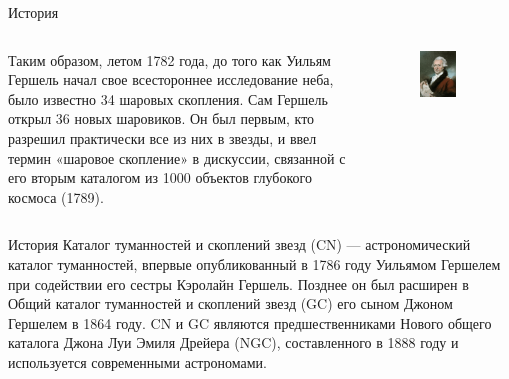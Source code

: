 \documentclass{beamer}
\begin{document}
    \begin{frame}{История}
        \begin{columns}
            \begin{column}{0.7\textwidth}
                Таким образом, летом 1782 года, до того как Уильям Гершель начал свое всестороннее исследование неба, 
                было известно 34 шаровых скопления. Сам Гершель открыл 36 новых шаровиков. Он был первым, кто разрешил практически все из них в звезды, 
                и ввел термин «шаровое скопление» в дискуссии, 
                связанной с его вторым каталогом из 1000 объектов глубокого космоса (1789).
            \end{column}
            \begin{column}{0.3\textwidth}
                \begin{figure}
                    \centering
                    \includegraphics[width=0.7\textwidth]{pictures/Gersh.jpg}
                \end{figure}
            \end{column}
        \end{columns}
    \end{frame}
    \begin{frame}{История}
        Каталог туманностей и скоплений звезд (CN) — астрономический каталог туманностей, 
        впервые опубликованный в 1786 году Уильямом Гершелем при содействии его сестры Кэролайн Гершель. 
        Позднее он был расширен в Общий каталог туманностей и скоплений звезд (GC) его сыном Джоном Гершелем в 1864 году. 
        CN и GC являются предшественниками Нового общего каталога Джона Луи Эмиля Дрейера (NGC), 
        составленного в 1888 году и используется современными астрономами.
    \end{frame}
\end{document}
